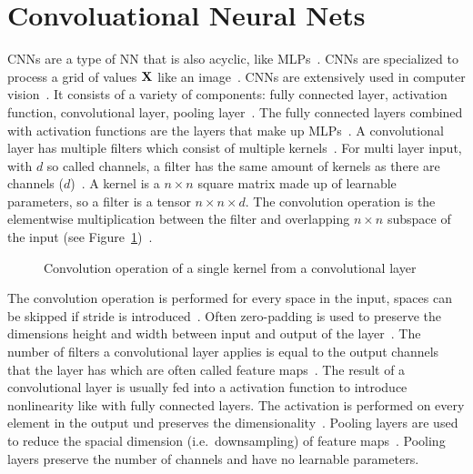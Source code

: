 \section{Convoluational Neural Nets}
\acp{CNN} are a type of \ac{NN} that is also acyclic, like \acp{MLP}~\citep{chauhan_review_2018}.
\acp{CNN} are specialized to process a grid of values $\textbf{X}$ like an image~\citep{goodfellow_deep_2016}.
\acp{CNN} are extensively used in computer vision~\citep{chauhan_review_2018}.
It consists of a variety of components: fully connected layer, activation function,
convolutional layer, pooling layer~\citep{chauhan_review_2018,ponti_everything_2017}.
The fully connected layers combined with activation functions are the layers that make up
\acp{MLP}~\citep{ponti_everything_2017}.
A convolutional layer has multiple filters which consist of multiple kernels~\citep{chauhan_review_2018}.
For multi layer input, with $d$ so called channels, a filter has the same amount of kernels as there
are channels ($d$)~\citep{ponti_everything_2017}.
A kernel is a $n\times n$ square matrix made up of learnable parameters, so a filter is a tensor
$n\times n\times d$.
The convolution operation is the elementwise multiplication between the filter and overlapping
$n\times n$ subspace of the input (see Figure~\ref{fig:conv-layer})~\citep{ponti_everything_2017}.
\begin{figure}[ht]
    \centering
    
    \caption{Convolution operation of a single kernel from a convolutional layer\label{fig:conv-layer}}
\end{figure}
The convolution operation is performed for every space in the input, spaces can be skipped if
stride is introduced~\citep{ponti_everything_2017}.
Often zero-padding is used to preserve the dimensions height and width between input and output of
the layer~\citep{ponti_everything_2017}.
The number of filters a convolutional layer applies is equal to the output channels that the layer
has which are often called feature maps~\citep{ponti_everything_2017}.
The result of a convolutional layer is usually fed into a activation function to introduce
nonlinearity like with fully connected layers.
The activation is performed on every element in the output und preserves the
dimensionality~\citep{ponti_everything_2017}.
Pooling layers are used to reduce the spacial dimension (i.e.\ downsampling) of feature
maps~\citep{ponti_everything_2017}.
Pooling layers preserve the number of channels and have no learnable parameters. %
